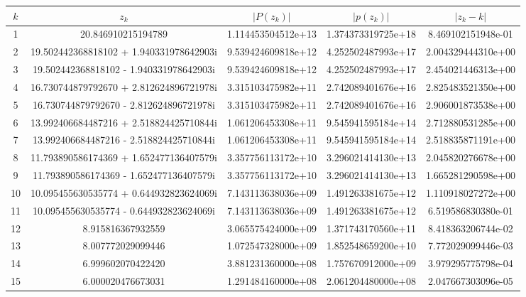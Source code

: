 \documentclass[11pt]{mk-polish-lab-report}
\begin{document}
\begin{table}[h]
        \centering
        \scriptsize
\begin{tabular}{c|c
		|S[
        table-number-alignment = right,
		table-figures-integer  = 1,
		table-figures-decimal = 12,
		table-figures-exponent=1
		]
		|S[
        table-number-alignment = right,
		table-figures-integer  = 1,
		table-figures-decimal = 12,
		table-figures-exponent=1
		]
		|S[
        table-number-alignment = right,
		table-figures-integer  = 1,
		table-figures-decimal = 12,
		table-figures-exponent=1
		]}
{$k$} & {$z_k$} & {$|P(z_k)|$} & {$|p(z_k)|$} & {$|z_k-k|$} \\ &20.846910215194789&1.114453504512e+13&1.374373319725e+18&8.469102151948e-01 \\
2&19.502442368818102 + 1.940331978642903i&9.539424609818e+12&4.252502487993e+17&2.004329444310e+00 \\
3&19.502442368818102 - 1.940331978642903i&9.539424609818e+12&4.252502487993e+17&2.454021446313e+00 \\
4&16.730744879792670 + 2.812624896721978i&3.315103475982e+11&2.742089401676e+16&2.825483521350e+00 \\
5&16.730744879792670 - 2.812624896721978i&3.315103475982e+11&2.742089401676e+16&2.906001873538e+00 \\
6&13.992406684487216 + 2.518824425710844i&1.061206453308e+11&9.545941595184e+14&2.712880531285e+00 \\
7&13.992406684487216 - 2.518824425710844i&1.061206453308e+11&9.545941595184e+14&2.518835871191e+00 \\
8&11.793890586174369 + 1.652477136407579i&3.357756113172e+10&3.296021414130e+13&2.045820276678e+00 \\
9&11.793890586174369 - 1.652477136407579i&3.357756113172e+10&3.296021414130e+13&1.665281290598e+00 \\
10&10.095455630535774 + 0.644932823624069i&7.143113638036e+09&1.491263381675e+12&1.110918027272e+00 \\
11&10.095455630535774 - 0.644932823624069i&7.143113638036e+09&1.491263381675e+12&6.519586830380e-01 \\
12&8.915816367932559&3.065575424000e+09&1.371743170560e+11&8.418363206744e-02 \\
13&8.007772029099446&1.072547328000e+09&1.852548659200e+10&7.772029099446e-03 \\
14&6.999602070422420&3.881231360000e+08&1.757670912000e+09&3.979295775798e-04 \\
15&6.000020476673031&1.291484160000e+08&2.061204480000e+08&2.047667303096e-05 \\

\end{tabular}
\end{table}
\end{document}
